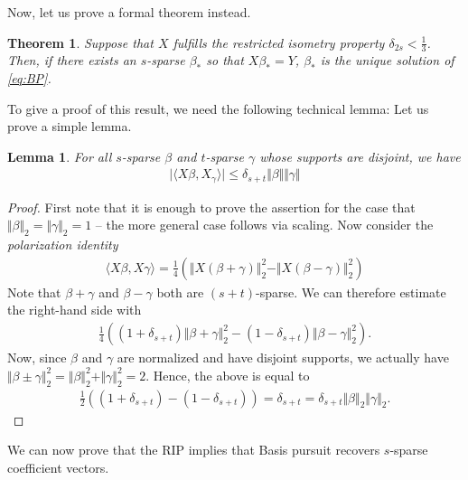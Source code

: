 \documentclass{article}
\newcommand{\sprod}[1]{\langle #1 \rangle}
\newtheorem{lemma}{Lemma}
\newtheorem{theorem}{Theorem}
\newcommand{\abs}[1]{\vert #1 \vert}
\newcommand{\norm}[1]{\Vert #1 \Vert}
\begin{document}
Now, let us prove a formal theorem instead.
\begin{theorem}
   Suppose that $X$ fulfills the restricted isometry property $\delta_{2s}<\tfrac{1}{3}$. Then, if there exists an $s$-sparse $\beta_*$ so that $X\beta_*=Y$, $\beta_*$ is the unique solution of \eqref{eq:BP}.
\end{theorem}
To give a proof of this result, we need the following technical lemma:
Let us prove a simple lemma.
\begin{lemma}
    For all $s$-sparse $\beta$ and $t$-sparse $\gamma$ whose supports are disjoint, we have
    \begin{align*}
        \abs{\sprod{X\beta,X_\gamma}} \leq \delta_{s+t} \norm{\beta}\norm{\gamma}
    \end{align*}
\end{lemma}
\begin{proof}

    First note that it is enough to prove the assertion for the case that $\norm{\beta}_2=\norm{\gamma}_2=1$ -- the more general case follows via scaling. Now consider the \emph{polarization identity}
    \begin{align*}
        \sprod{X\beta,X\gamma} = \frac{1}{4}\left( \norm{X(\beta+\gamma)}_2^2 - \norm{X(\beta-\gamma)}_2^2\right)
    \end{align*}
    Note that $\beta+\gamma$ and $\beta-\gamma$ both are $(s+t)$-sparse. We can therefore estimate the right-hand side with 
    \begin{align*}
        \frac{1}{4}((1+\delta_{s+t})\norm{\beta+\gamma}_2^2 - (1-\delta_{s+t})\norm{\beta- \gamma}^2_2).
    \end{align*}
    Now, since $\beta$ and $\gamma$ are normalized and have disjoint supports, we actually have $\norm{\beta \pm \gamma}_2^2 = \norm{\beta}_2^2+\norm{\gamma}_2^2=2$. Hence, the above is equal to
    \begin{align*}
        \frac{1}{2}((1+\delta_{s+t}) - (1-\delta_{s+t})) = \delta_{s+t} = \delta_{s+t}\norm{\beta}_2\norm{\gamma}_2.
    \end{align*}
\end{proof}
We can now prove that the RIP implies that Basis pursuit recovers $s$-sparse coefficient vectors.
\end{document}
